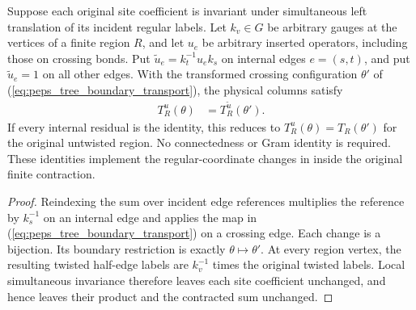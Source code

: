 \begin{lemma}%
    \label{thm:peps_regular_region_gauge_contraction}
    \leanok
    Suppose each original site coefficient is invariant under simultaneous
    left translation of its incident regular labels. Let $k_v\in G$ be
    arbitrary gauges at the vertices of a finite region $R$, and let $u_e$
    be arbitrary inserted operators, including those on crossing bonds.
    Put $\widetilde u_e=k_t^{-1}u_ek_s$ on internal edges $e=(s,t)$,
    and put $\widetilde u_e=1$ on all other edges. With the transformed
    crossing configuration $\theta'$ of
    (\ref{eq:peps_tree_boundary_transport}), the physical columns satisfy
    \begin{align}
        T_R^u(\theta) & =T_R^{\widetilde u}(\theta').
    \end{align}
    If every internal residual is the identity, this reduces to
    $T_R^u(\theta)=T_R(\theta')$ for the original untwisted region.
    No connectedness or Gram identity is required. These identities
    implement the regular-coordinate changes in
    \cite[\S6.2--6.3]{Schuch2010PEPS} inside the original finite contraction.
\end{lemma}

\begin{proof}\leanok
    Reindexing the sum over incident edge references multiplies the reference
    by $k_s^{-1}$ on an internal edge and applies
    the map in (\ref{eq:peps_tree_boundary_transport}) on a crossing edge. Each change
    is a bijection. Its boundary restriction is exactly $\theta\mapsto\theta'$.
    At every region vertex, the resulting twisted half-edge labels are
    $k_v^{-1}$ times the original twisted labels. Local simultaneous
    invariance therefore leaves each site coefficient unchanged, and
    hence leaves their product and the contracted sum unchanged.
\end{proof}


